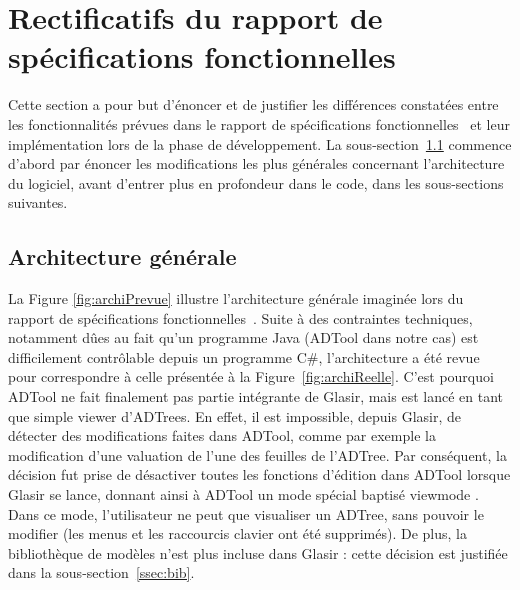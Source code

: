 \section{Rectificatifs du rapport de spécifications fonctionnelles}
\label{sec:rect}

Cette section a pour but d'énoncer et de justifier les différences constatées entre les fonctionnalités prévues dans le rapport de spécifications fonctionnelles~\cite{spec_fonc} et leur implémentation lors de la phase de développement. La {\sc sous-section}~\ref{subsec:archi} commence d'abord par énoncer les modifications les plus générales concernant l'architecture du logiciel, avant d'entrer plus en profondeur dans le code, dans les sous-sections suivantes.

\subsection{Architecture générale}
\label{subsec:archi}

La {\sc Figure} \ref{fig:archiPrevue} illustre l'architecture générale imaginée lors du rapport de spécifications fonctionnelles~\cite{spec_fonc}. Suite à des contraintes techniques, notamment dûes au fait qu'un programme Java (ADTool dans notre cas) est difficilement contrôlable depuis un programme C\#, l'architecture a été revue pour correspondre à celle présentée à la {\sc Figure}~\ref{fig:archiReelle}. C'est pourquoi ADTool ne fait finalement pas partie intégrante de Glasir, mais est lancé en tant que simple \og viewer \fg{} d'ADTrees. En effet, il est impossible, depuis Glasir, de détecter des modifications faites dans ADTool, comme par exemple la modification d'une valuation de l'une des feuilles de l'ADTree. Par conséquent, la décision fut prise de désactiver toutes les fonctions d'édition dans ADTool lorsque Glasir se lance, donnant ainsi à ADTool un mode spécial baptisé \og viewmode \fg{}. Dans ce mode, l'utilisateur ne peut que visualiser un ADTree, sans pouvoir le modifier (les menus et les raccourcis clavier ont été supprimés). De plus, la bibliothèque de modèles n'est plus incluse dans Glasir : cette décision est justifiée dans la {\sc sous-section}~\ref{ssec:bib}.


